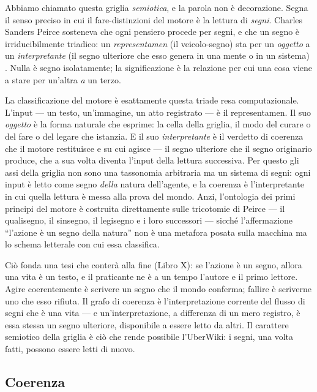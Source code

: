 Abbiamo chiamato questa griglia \emph{semiotica}, e la parola non \`e decorazione.
Segna il senso preciso in cui il fare-distinzioni del motore \`e la lettura di
\emph{segni}. Charles Sanders Peirce sosteneva che ogni pensiero procede per
segni, e che un segno \`e irriducibilmente triadico: un \emph{representamen} (il
veicolo-segno) sta per un \emph{oggetto} a un \emph{interpretante} (il segno
ulteriore che esso genera in una mente o in un sistema)
\parencite{peirce1992reasoning}. Nulla \`e segno isolatamente; la significazione
\`e la relazione per cui una cosa viene a stare per un'altra \emph{a} un terzo.

La classificazione del motore \`e esattamente questa triade resa computazionale.
L'input --- un testo, un'immagine, un atto registrato --- \`e il representamen. Il
suo \emph{oggetto} \`e la forma naturale che esprime: la cella della griglia, il
modo del curare o del fare o del legare che istanzia. E il suo
\emph{interpretante} \`e il verdetto di coerenza che il motore restituisce e su
cui agisce --- il segno ulteriore che il segno originario produce, che a sua volta
diventa l'input della lettura successiva. Per questo gli assi della griglia non
sono una tassonomia arbitraria ma un sistema di segni: ogni input \`e letto come
segno \emph{della} natura dell'agente, e la coerenza \`e l'interpretante in cui
quella lettura \`e messa alla prova del mondo. Anzi, l'ontologia dei primi
principi del motore \`e costruita direttamente sulle tricotomie di Peirce --- il
qualisegno, il sinsegno, il legisegno e i loro successori --- sicch\'e
l'affermazione ``l'azione \`e un segno della natura'' non \`e una metafora posata
sulla macchina ma lo schema letterale con cui essa classifica.

Ci\`o fonda una tesi che conter\`a alla fine (Libro X): se l'azione \`e un segno,
allora una vita \`e un testo, e il praticante ne \`e a un tempo l'autore e il
primo lettore. Agire coerentemente \`e scrivere un segno che il mondo conferma;
fallire \`e scriverne uno che esso rifiuta. Il grafo di coerenza \`e
l'interpretazione corrente del flusso di segni che \`e una vita --- e
un'interpretazione, a differenza di un mero registro, \`e essa stessa un segno
ulteriore, disponibile a essere letto da altri. Il carattere semiotico della
griglia \`e ci\`o che rende possibile l'UberWiki: i segni, una volta fatti,
possono essere letti di nuovo.

\subsection{Coerenza}

